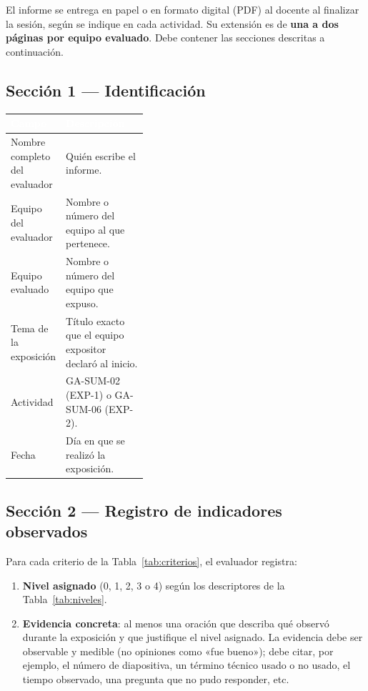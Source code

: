 \documentclass[11pt]{article}
\newcommand{\bhdr}[1]{\cellcolor{midblue}\textcolor{white}{\textbf{#1}}}
\begin{document}
El informe se entrega en papel o en formato digital (PDF) al docente al finalizar la sesión, según se indique en cada actividad. Su extensión es de \textbf{una a dos páginas por equipo evaluado}. Debe contener las secciones descritas a continuación.

\subsection{\textcolor{midblue}{Sección 1 --- Identificación}}

\noindent\begin{tabularx}{\linewidth}{|L{0.38\linewidth}|Y|}
	\hline
	\bhdr{Campo} & \bhdr{Descripción}\\
	\hline
	Nombre completo del evaluador & Quién escribe el informe.\\
	\hline
	 Equipo del evaluador & Nombre o número del equipo al que pertenece.\\
	\hline
	Equipo evaluado & Nombre o número del equipo que expuso.\\
	\hline
	 Tema de la exposición & Título exacto que el equipo expositor declaró al inicio.\\
	\hline
	Actividad & GA-SUM-02 (EXP-1) o GA-SUM-06 (EXP-2).\\
	\hline
	 Fecha & Día en que se realizó la exposición.\\
	\hline
\end{tabularx}

\subsection{\textcolor{midblue}{Sección 2 --- Registro de indicadores observados}}

Para cada criterio de la Tabla~\ref{tab:criterios}, el evaluador registra:
\begin{enumerate}[leftmargin=18pt,itemsep=3pt]
	\item \textbf{Nivel asignado} (0, 1, 2, 3 o 4) según los descriptores de la Tabla~\ref{tab:niveles}.
	\item \textbf{Evidencia concreta}: al menos una oración que describa qué observó durante la exposición y que justifique el nivel asignado. La evidencia debe ser observable y medible (no opiniones como «fue bueno»); debe citar, por ejemplo, el número de diapositiva, un término técnico usado o no usado, el tiempo observado, una pregunta que no pudo responder, etc.
\end{enumerate}
\end{document}
